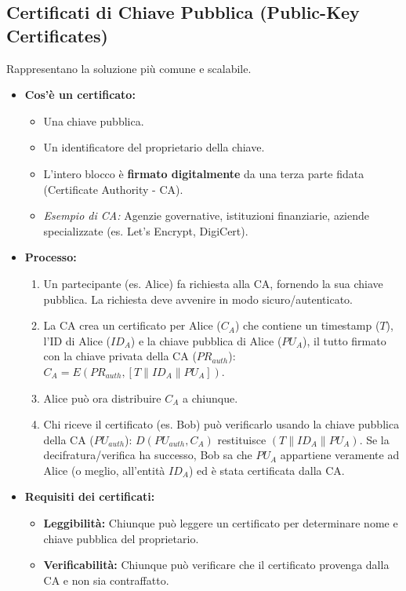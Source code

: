 \subsection{Certificati di Chiave Pubblica (Public-Key Certificates)}
Rappresentano la soluzione più comune e scalabile.
\begin{itemize}
    \item \textbf{Cos'è un certificato:}
        \begin{itemize}
            \item Una chiave pubblica.
            \item Un identificatore del proprietario della chiave.
            \item L'intero blocco è \textbf{firmato digitalmente} da una terza parte fidata (Certificate Authority - CA).
            \item \textit{Esempio di CA:} Agenzie governative, istituzioni finanziarie, aziende specializzate (es. Let's Encrypt, DigiCert).
        \end{itemize}
    \item \textbf{Processo:}
        \begin{enumerate}
            \item Un partecipante (es. Alice) fa richiesta alla CA, fornendo la sua chiave pubblica. La richiesta deve avvenire in modo sicuro/autenticato.
            \item La CA crea un certificato per Alice ($C_A$) che contiene un timestamp ($T$), l'ID di Alice ($ID_A$) e la chiave pubblica di Alice ($PU_A$), il tutto firmato con la chiave privata della CA ($PR_{auth}$): $C_A = E(PR_{auth}, [T \parallel ID_A \parallel PU_A])$.
            \item Alice può ora distribuire $C_A$ a chiunque.
            \item Chi riceve il certificato (es. Bob) può verificarlo usando la chiave pubblica della CA ($PU_{auth}$): $D(PU_{auth}, C_A)$ restituisce $(T \parallel ID_A \parallel PU_A)$. Se la decifratura/verifica ha successo, Bob sa che $PU_A$ appartiene veramente ad Alice (o meglio, all'entità $ID_A$) ed è stata certificata dalla CA.
        \end{enumerate}
    \item \textbf{Requisiti dei certificati:}
        \begin{itemize}
            \item \textbf{Leggibilità:} Chiunque può leggere un certificato per determinare nome e chiave pubblica del proprietario.
            \item \textbf{Verificabilità:} Chiunque può verificare che il certificato provenga dalla CA e non sia contraffatto.

\end{itemize}
\end{itemize}
